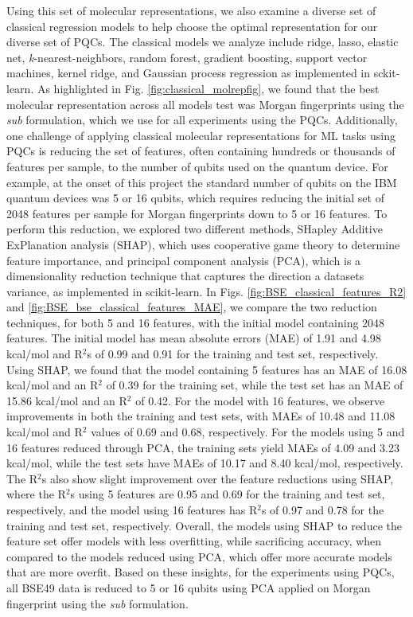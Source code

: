 \documentclass[journal=jacsat,manuscript=article]{achemso}
\begin{document}
Using this set of molecular representations, we also examine a diverse set of classical regression models to help choose the optimal representation for our diverse set of PQCs.
The classical models we analyze include ridge, lasso, elastic net, \textit{k}-nearest-neighbors, random forest, gradient boosting, support vector machines, kernel ridge, and Gaussian process regression as implemented in sckit-learn.\cite{pedregosa_scikit-learn_2011}
As highlighted in Fig. \ref{fig:classical_molrepfig}, we found that the best molecular representation across all models test was Morgan fingerprints using the \textit{sub} formulation, which we use for all experiments using the PQCs.
Additionally, one challenge of applying classical molecular representations for ML tasks using PQCs is reducing the set of features, often containing hundreds or thousands of features per sample, to the number of qubits used on the quantum device.
For example, at the onset of this project the standard number of qubits on the IBM quantum devices was 5 or 16 qubits, which requires reducing the initial set of 2048 features per sample for Morgan fingerprints down to 5 or 16 features.
To perform this reduction, we explored two different methods, SHapley Additive ExPlanation analysis (SHAP)\cite{lundberg_unified_2017}, which uses cooperative game theory to determine feature importance, and principal component analysis (PCA), which is a dimensionality reduction technique that captures the direction a datasets variance, as implemented in scikit-learn.\cite{pedregosa_scikit-learn_2011}
In Figs. \ref{fig:BSE_classical_features_R2} and \ref{fig:BSE_bse_classical_features_MAE}, we compare the two reduction techniques, for both 5 and 16 features, with the initial model containing 2048 features.
The initial model has mean absolute errors (MAE) of 1.91 and 4.98 kcal/mol and R$^{2}$s of 0.99 and 0.91 for the training and test set, respectively.
Using SHAP, we found that the model containing 5 features has an MAE of 16.08 kcal/mol and an R$^{2}$ of 0.39 for the training set, while the test set has an MAE of 15.86 kcal/mol and an R$^{2}$ of 0.42.
For the model with 16 features, we observe improvements in both the training and test sets, with MAEs of 10.48 and 11.08 kcal/mol and R$^{2}$ values of 0.69 and 0.68, respectively.
For the models using 5 and 16 features reduced through PCA, the training sets yield MAEs of 4.09 and 3.23 kcal/mol, while the test sets have MAEs of 10.17 and 8.40 kcal/mol, respectively.
The R$^{2}$s also show slight improvement over the feature reductions using SHAP, where the R$^{2}$s using 5 features are 0.95 and 0.69 for the training and test set, respectively, and the model using 16 features has R$^{2}$s of 0.97 and 0.78 for the training and test set, respectively.
Overall, the models using SHAP to reduce the feature set offer models with less overfitting, while sacrificing accuracy, when compared to the models reduced using PCA, which offer more accurate models that are more overfit. 
Based on these insights, for the experiments using PQCs, all BSE49 data is reduced to 5 or 16 qubits using PCA applied on Morgan fingerprint using the \textit{sub} formulation.
\end{document}
